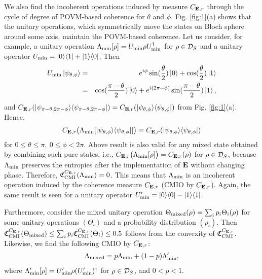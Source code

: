 \documentclass[american,aps,pra,reprint, superscriptaddress]{revtex4-1}
\def\be{\begin{equation}}
\def\ee{\end{equation}}
\def\bea{\begin{eqnarray*}}
\def\eea{\end{eqnarray*}}
\theoremstyle{plain}
\newcommand{\out}[2]{| #1\rangle\langle #2 |}
\def\mCMI{\textmd{CMI}} \def\mI{\textmd{I}} \def\mPI{\textmd{PI}}
\def\fC{\mathfrak{C}}\def\fD{\mathfrak{D}}\def\fF{\mathfrak{F}}\def\fP{\mathfrak{P}}
\theoremstyle{definition}
\theoremstyle{remark}
\begin{document}
We also find the incoherent operations induced by measure $C_{\mathbf{E},r}$ through the cycle of degree of POVM-based coherence for $\theta$ and $\phi$.
Fig. \ref{fig:1}(a) shows that the unitary operations, which symmetrically move the states on Bloch sphere around some axis, maintain the POVM-based coherence.
Let us consider, for example, a unitary operation $\Lambda_{\textmd{min}}[\rho] = U_{\textmd{min}}\rho U_{\textmd{min}}^{\dagger}$ for $\rho \in \mathcal{D}_S$ and a unitary operator $U_{\textmd{min}} =\out{0}{1}+\out{1}{0}$.
Then
\bea
U_{\textmd{min}}\ket{\psi_{\theta,\phi}} &=& e^{i\phi}\sin(\frac{\theta}{2})\ket{0}+ \cos(\frac{\theta}{2})\ket{1}\\
&=& \cos(\frac{\pi-\theta}{2})\ket{0}+ e^{i(2\pi-\phi)}\sin(\frac{\pi-\theta}{2})\ket{1},
\eea
and $C_{\bE,r}(\out{\psi_{\pi-\theta,2\pi-\phi}}{\psi_{\pi-\theta,2\pi-\phi}}) = C_{\bE,r}(\out{\psi_{\theta,\phi}}{\psi_{\theta,\phi}})$ from Fig. \ref{fig:1}(a). Hence,
\be
C_{\bE,r}\big(\Lambda_{\textmd{min}}[\out{\psi_{\theta,\phi}}{\psi_{\theta,\phi}}]\big) = C_{\bE,r}(\out{\psi_{\theta,\phi}}{\psi_{\theta,\phi}})
\ee
for $0\leq\theta\leq \pi,\ 0\leq \phi <2\pi$. Above result is also valid for any mixed state obtained by combining such pure states, i.e., $C_{\mathbf{E},r}\big(\Lambda_{\textmd{min}}[\rho]\big) = C_{\mathbf{E},r}(\rho)$ for $\rho \in \mathcal{D}_{S}$, because $\Lambda_{\textmd{min}}$ preserves the entropies after the implementation of $\mathbf{E}$ without changing phase. Therefore, $\fC_{\mCMI}^{C_{\bE,r}}(\Lambda_{\textmd{min}}) = 0$. This means that $\Lambda_{\textmd{min}}$ is an incoherent operation induced by the coherence measure $C_{\mathbf{E},r}$ (CMIO by $C_{\mathbf{E},r}$). Again, the same result is seen for a unitary operator $U_{\textmd{min}}' = \out{0}{0} - \out{1}{1}$.

Furthermore, consider the mixed unitary operation $\Theta_{\textmd{mixed}}(\rho) = \sum_i p_i \Theta_{i}(\rho)$ for some unitary operations $(\Theta_{i})$ and a probability distribution $(p_i)$. Then $\fC_{\mCMI}^{C_{\bE,r}}(\Theta_{\textmd{mixed}}) \leq \sum_i p_i\fC_{\mCMI}^{C_{\bE,r}}(\Theta_{i}) \leq 0.5$ follows from the convexity of $\fC_{\mCMI}^{C_{\bE,r}}$. Likewise, we find the following CMIO by $C_{\mathbf{E},r}$:
\bea
\Lambda_{\textmd{mixed}} = p\Lambda_{\textmd{min}} + (1-p)\Lambda'_{\textmd{min}},
\eea
where $\Lambda'_{\textmd{min}}[\rho] = U'_{\textmd{min}}\rho (U'_{\textmd{min}})^{\dagger}$ for $\rho \in \mathcal{D}_S$, and $0< p < 1$.
\end{document}
